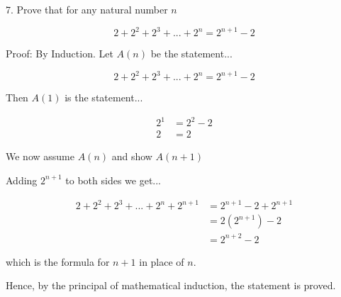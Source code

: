 \documentclass[12pt]{article}
\begin{document}
7. Prove that for any natural number $n$

$$2 + 2^2 + 2^3 + ... + 2^n = 2^{n+1} - 2$$ 


Proof: By Induction.  Let $A(n)$ be the statement...

$$2 + 2^2 + 2^3 + ... + 2^n = 2^{n+1} - 2$$ 

Then $A(1)$ is the statement...

\begin{align*}
2^1 &= 2^2 - 2\\
2 &= 2
\end{align*}

We now assume $A(n)$ and show $A(n+1)$\newline

Adding $2^{n+1}$ to both sides we get...

\begin{align*}
2 + 2^2 + 2^3 + ... + 2^n + 2^{n+1} &= 2^{n+1} - 2 + 2^{n+1}\\
&= 2(2^{n+1}) - 2\\
&= 2^{n+2} - 2
\end{align*}

which is the formula for $n+1$ in place of $n$.\newline

Hence, by the principal of mathematical induction, the statement is proved.
\end{document}
